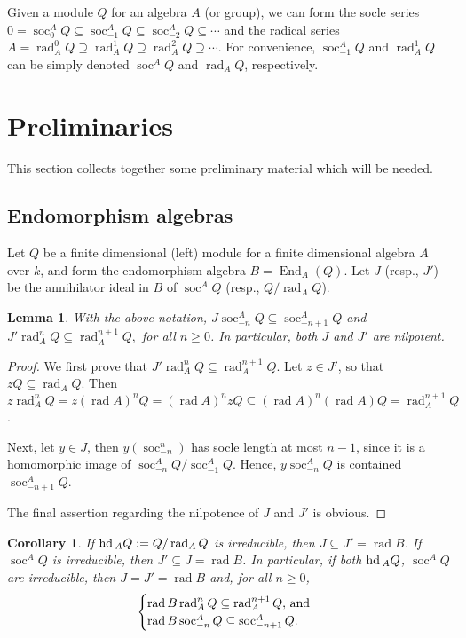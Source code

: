 \documentclass[11pt,leqno,amscd,amssymb,verbatim, url]{amsart}
\newtheorem{lem}[thm]{Lemma}
\newtheorem{cor}[thm]{Corollary}
\theoremstyle{definition}
\numberwithin{equation}{thm}
\newcommand{\head}{{\text{\rm hd}}\,}
\newcommand{\End}{\operatorname{End}}
\newcommand{\soc}{\operatorname{soc}}
\newcommand{\rad}{\operatorname{rad}}
\begin{document}
 Given a module $Q$ for an algebra $A$ (or group), we can form the socle series $0=\soc^A_0Q\subseteq\soc^A_{-1}Q
\subseteq\soc_{-2}^AQ\subseteq\cdots$ and the radical series $A=\rad_A^0Q\supseteq\rad^1_AQ\supseteq\rad_A^2Q\supseteq\cdots$. For convenience,
$\soc_{-1}^AQ$ and $\rad^1_AQ$ can be simply denoted $\soc^AQ$ and $\rad_AQ$, respectively.


\section{Preliminaries} This section collects together some preliminary material which will be needed.

 \subsection{Endomorphism algebras}
Let $Q$ be a finite dimensional (left) module for a finite dimensional algebra $A$ over $k$, and form the endomorphism algebra
 $B=\End_A(Q)$. Let $J$ (resp., $J'$) be the annihilator ideal in $B$ of $\soc^AQ$ (resp., $Q/\rad_A Q$).

\begin{lem}\label{firstlemma} With the above notation,
 $J\soc^A_{-n}Q\subseteq \soc^A_{-n+1}Q$ and $J'\rad_A^nQ\subseteq\rad_A^{n+1}Q,$ for all $n\geq 0$.
In particular, both $J$ and $J'$ are   nilpotent. \end{lem}
\begin{proof} We first prove that $J'\rad_A^nQ\subseteq\rad_A^{n+1}Q$. Let $z\in J'$, so that $zQ\subseteq \rad_A Q$. Then
$z\rad_A^nQ=z(\rad A)^nQ=(\rad A)^nzQ\subseteq(\rad A)^n(\rad A)Q=\rad^{n+1}_AQ$.

Next, let $y\in J$, then $y(\soc_{-n}^n)$ has socle length at most
$n-1$, since it is a homomorphic image of $\soc^A_{-n}Q/\soc^A_{-1}Q$. Hence, $y\soc^A_{-n}Q$ is
 contained $\soc^A_{-n+1}Q$. 
 
 The final assertion regarding the nilpotence of $J$ and $J'$ is obvious. \end{proof}


\begin{cor}\label{firstcor}If $\head_AQ:=Q/\rad_AQ$ is irreducible, then $J\subseteq J'=\rad B$. If $\soc^AQ$ is irreducible, then $J'\subseteq J=\rad B$.
In particular, if both $\head_A Q$, $\soc^AQ$ are irreducible, then $J=J'=\rad B$ and, for all $n\geq 0$,
$$\begin{cases}\rad B\rad^n_AQ\subseteq\rad^{n+1}_AQ, \,{\text{\rm and}}\\
\rad B\soc^A_{-n}Q\subseteq\soc^A_{-n+1}Q.\end{cases}$$
\end{cor}
\end{document}

